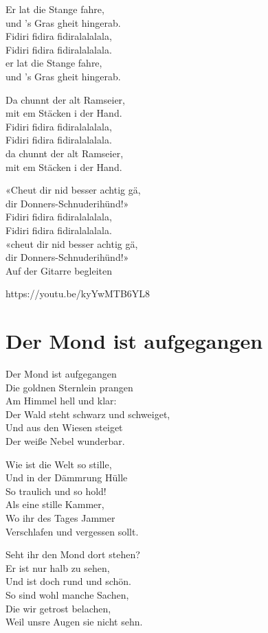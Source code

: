 \documentclass[
  letterpaper,
  twoside=false]{scrbook}
\begin{document}
Er lat die Stange fahre,\\
und 's Gras gheit hingerab.\\
Fidiri fidira fidiralalalala,\\
Fidiri fidira fidiralalalala.\\
er lat die Stange fahre,\\
und 's Gras gheit hingerab.

Da chunnt der alt Ramseier,\\
mit em Stäcken i der Hand.\\
Fidiri fidira fidiralalalala,\\
Fidiri fidira fidiralalalala.\\
da chunnt der alt Ramseier,\\
mit em Stäcken i der Hand.

«Cheut dir nid besser achtig gä,\\
dir Donners-Schnuderihünd!»\\
Fidiri fidira fidiralalalala,\\
Fidiri fidira fidiralalalala.\\
«cheut dir nid besser achtig gä,\\
dir Donners-Schnuderihünd!»\\
Auf der Gitarre begleiten

https://youtu.be/kyYwMTB6YL8

\hypertarget{der-mond-ist-aufgegangen}{%
\chapter{Der Mond ist aufgegangen}\label{der-mond-ist-aufgegangen}}

Der Mond ist aufgegangen\\
Die goldnen Sternlein prangen\\
Am Himmel hell und klar:\\
Der Wald steht schwarz und schweiget,\\
Und aus den Wiesen steiget\\
Der weiße Nebel wunderbar.

Wie ist die Welt so stille,\\
Und in der Dämmrung Hülle\\
So traulich und so hold!\\
Als eine stille Kammer,\\
Wo ihr des Tages Jammer\\
Verschlafen und vergessen sollt.

Seht ihr den Mond dort stehen?\\
Er ist nur halb zu sehen,\\
Und ist doch rund und schön.\\
So sind wohl manche Sachen,\\
Die wir getrost belachen,\\
Weil unsre Augen sie nicht sehn.
\end{document}
